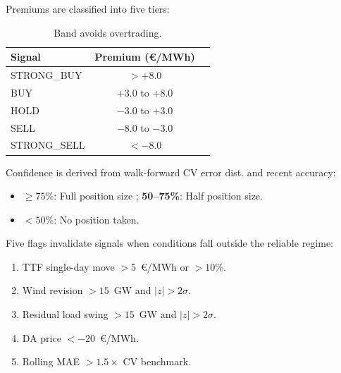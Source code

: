 \documentclass[11pt,a4paper]{article}
\begin{document}
\noindent
\begin{minipage}[t]{0.35\textwidth}
Premiums are classified into five tiers:
\vspace{2pt}
\begin{table}[H]
\centering
\small
\begin{tabular}{@{}lcc@{}}
\toprule
\textbf{Signal} & \textbf{Premium (\euro/MWh)}  \\
\midrule
STRONG\_BUY  & $> +8.0$           \\
BUY          & $+3.0$ to $+8.0$        \\
HOLD         & $-3.0$ to $+3.0$         \\
SELL         & $-8.0$ to $-3.0$     \\
STRONG\_SELL & $< -8.0$         \\
\bottomrule
\end{tabular}
\caption{Band avoids overtrading.}
\end{table}
\end{minipage}
\hfill
\begin{minipage}[t]{0.65\textwidth}
Confidence is derived from walk-forward CV error dist. and recent accuracy:
\vspace{4pt}
\begin{itemize}[noitemsep, leftmargin=*]
  \item \textbf{$\geq 75\%$}: Full position size ; \textbf{50--75\%}: Half position size.
  \item \textbf{$< 50\%$}: No position taken.
\end{itemize}
\vspace{6pt}
Five flags invalidate signals when conditions fall outside the reliable regime:
\begin{enumerate}[noitemsep, leftmargin=*]
  \item TTF single-day move $>5$~\euro/MWh or $>10\%$.
  \item Wind revision $>15$~GW and $|z|>2\sigma$.
  \item Residual load swing $>15$~GW and $|z|>2\sigma$.
  \item DA price $<-20$~\euro/MWh.
  \item Rolling MAE $>1.5\times$ CV benchmark.
\end{enumerate}
\end{minipage}

\vspace{4pt}
\end{document}
